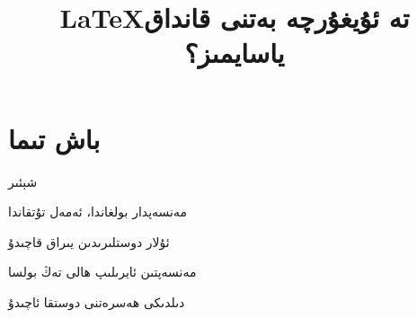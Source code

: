 \documentclass[12pt]{article}
\begin{document}
\title{\textarabic{\LaTeX  تە ئۇيغۇرچە بەتنى قانداق ياسايمىز؟ }}
\maketitle{}

\section{\textarabic{باش تىما}}
\textarabic{شېئىر}

\begin{Arabic}
مەنسەپدار بولغاندا، ئەمەل تۇتقاندا

ئۇلار دوستلىرىدىن يىراق قاچىدۇ

مەنسەپتىن ئايرىلىپ ھالى تەڭ بولسا

دىلدىكى ھەسرەتنى دوستقا ئاچىدۇ

\end{Arabic}
    
    
\end{document}
